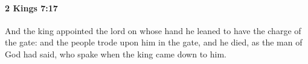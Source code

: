 
		\paragraph{2 Kings 7:17} %
			\label{2KINGS-7-17}

			And the king appointed the lord on whose hand he leaned to have the charge of the gate: and the people trode upon him in the gate, and he died, as the man of God had said, who spake when the king came down to him.



